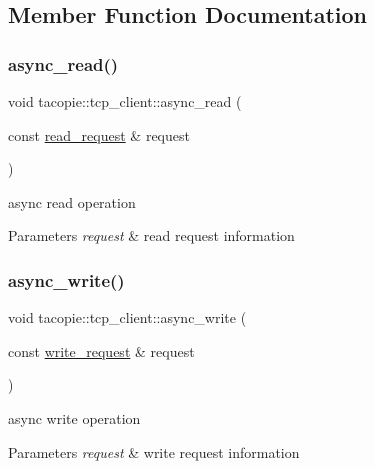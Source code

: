 \subsection{Member Function Documentation}
\mbox{\label{classtacopie_1_1tcp__client_a120e3ec2902acc902f7a0b27074bda6b}} 
\subsubsection{\texorpdfstring{async\+\_\+read()}{async\_read()}}
{\footnotesize\ttfamily void tacopie\+::tcp\+\_\+client\+::async\+\_\+read (\begin{DoxyParamCaption}\item[{const \hyperlink{structtacopie_1_1tcp__client_1_1read__request}{read\+\_\+request} \&}]{request }\end{DoxyParamCaption})}

async read operation


\begin{DoxyParams}{Parameters}
{\em request} & read request information \\
\hline
\end{DoxyParams}
\mbox{\label{classtacopie_1_1tcp__client_a2304ed6d4ca0cbc74e6aa72d3e92b76a}} 
\subsubsection{\texorpdfstring{async\+\_\+write()}{async\_write()}}
{\footnotesize\ttfamily void tacopie\+::tcp\+\_\+client\+::async\+\_\+write (\begin{DoxyParamCaption}\item[{const \hyperlink{structtacopie_1_1tcp__client_1_1write__request}{write\+\_\+request} \&}]{request }\end{DoxyParamCaption})}

async write operation


\begin{DoxyParams}{Parameters}
{\em request} & write request information \\
\hline
\end{DoxyParams}
\mbox{\label{classtacopie_1_1tcp__client_a0cfbb18cb72aa3b6a41921f61cacc425}} 
